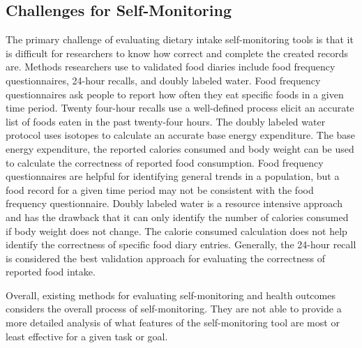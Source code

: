 \subsection{Challenges for Self-Monitoring}
The primary challenge of evaluating dietary intake self-monitoring tools  is that it is difficult for researchers to know how correct and complete the created records are. Methods researchers use to validated food diaries include food frequency questionnaires, 24-hour recalls, and doubly labeled water. Food frequency questionnaires ask people to report how often they eat specific foods in a given time period. Twenty four-hour recalls use a well-defined process elicit an accurate list of foods eaten in the past twenty-four hours. The doubly labeled water protocol uses isotopes to calculate an accurate base energy expenditure. The base energy expenditure, the reported calories consumed and body weight can be used to calculate the correctness of reported food consumption. Food frequency questionnaires are helpful for identifying general trends in a population, but a food record for a given time period may not be consistent with the food frequency questionnaire. Doubly labeled water is a resource intensive approach and has the drawback that it can only identify the number of calories consumed if body weight does not change. The calorie consumed calculation does not help identify the correctness of specific food diary entries.  Generally, the 24-hour recall is considered the best validation approach for evaluating the correctness of reported food intake. 

Overall, existing methods for evaluating self-monitoring and health outcomes considers the overall process of self-monitoring. They are not able to provide a more detailed analysis of what features of the self-monitoring tool are most or least effective for a given task or goal. 







